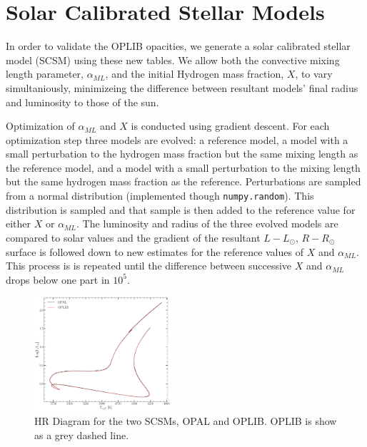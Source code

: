 \section{Solar Calibrated Stellar Models}


In order to validate the OPLIB opacities, we generate a solar calibrated
stellar model (SCSM) using these new tables. We allow both the convective
mixing length parameter, $\alpha_{ML}$, and the initial Hydrogen mass fraction,
$X$, to vary simultaniously, minimizeing the difference between
resultant models' final radius and luminosity to those of the sun.

Optimization of $\alpha_{ML}$ and $X$ is conducted using gradient descent. For
each optimization step three models are evolved: a reference model, a model
with a small perturbation to the hydrogen mass fraction but the same mixing
length as the reference model, and a model with a small perturbation to the
mixing length but the same hydrogen mass fraction as the reference.
Perturbations are sampled from a normal distribution (implemented though
\texttt{numpy.random}). This distribution is sampled and that sample is then
added to the reference value for either $X$ or $\alpha_{ML}$. The luminosity
and radius of the three evolved models are compared to solar values and the
gradient of the resultant $L-L_{\odot}$, $R-R_{\odot}$ surface is followed down
to new estimates for the reference values of $X$ and $\alpha_{ML}$. This
process is is repeated until the difference between successive $X$ and
$\alpha_{ML}$ drops below one part in $10^{5}$.

\begin{figure}
	\centering
	\includegraphics[width=0.45\textwidth]{src/figures/HRDiagramOPALvsOPLIB_SCCM.pdf}
	\caption{HR Diagram for the two SCSMs, OPAL and OPLIB. OPLIB is show as a grey
	dashed line.}
	\label{fig:OPLIBOPALHR}
\end{figure}

